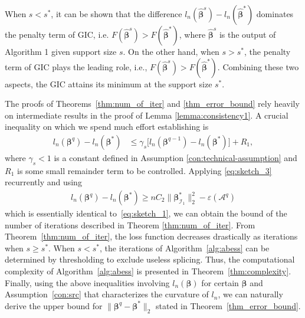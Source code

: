 When $s < s^*$, it can be shown that the difference $l_n(\hat{\boldsymbol \beta}^s) - l_n(\hat{\boldsymbol \beta}^*)$ dominates the penalty term of GIC, i.e. $F(\hat{\boldsymbol \beta}^s) > F(\hat{\boldsymbol \beta}^*)$, where $\hat{\boldsymbol \beta}^s$ is the output of Algorithm 1 given support size $s$. On the other hand, when $s>s^*$, the penalty term of GIC plays the leading role, i.e., $F(\hat{\boldsymbol \beta}^s) > F(\hat{\boldsymbol \beta}^*)$. Combining these two aspects, the GIC attains its minimum at the support size $s^*$.

The proofs of Theorems~\ref{thm:num_of_iter} and \ref{thm_error_bound} rely heavily on intermediate results in the proof of Lemma \ref{lemma:consistency1}. A crucial inequality on which we spend much effort establishing is
\begin{align}\label{eq:sketch_3}
l_n(\boldsymbol \beta^{q})-l_n(\boldsymbol \beta^*) & \leq \gamma_{s}\Big[l_n(\boldsymbol \beta^{q-1})-l_n(\boldsymbol \beta^*)\Big] + R_1,
\end{align}
where $\gamma_s<1$ is a constant defined in Assumption \ref{con:technical-assumption} and $R_1$ is some small remainder term to be controlled. Applying \eqref{eq:sketch_3} recurrently and using
\begin{align}\label{eq:sketch_4}
l_n({\boldsymbol \beta}^{q}) - l_n(\boldsymbol \beta^*) \geq nC_2 \|\boldsymbol \beta^*_{\mathcal{I}_1} \|_2^2 - \varepsilon({\mathcal{A}^{q}})
\end{align}
which is essentially identical to~\eqref{eq:sketch_1}, we can obtain the bound of the number of iterations described in Theorem \ref{thm:num_of_iter}. From Theorem~\ref{thm:num_of_iter}, the loss function decreases drastically as iterations when $s \geq s^*$. When $s<s^*$, the iterations of Algorithm~\ref{alg:abess} can be determined by thresholding to exclude useless splicing. Thus, the computational complexity of Algorithm~\ref{alg:abess} is presented in Theorem~\ref{thm:complexity}.
Finally, using the above inequalities involving $l_n({\boldsymbol \beta})$ for certain $\boldsymbol \beta$ and Assumption~\ref{con:src} that characterizes the curvature of $l_n$, we can naturally derive the upper bound for $\|\boldsymbol \beta^q-\boldsymbol \beta^{*}\|_{2}$ stated in Theorem~\ref{thm_error_bound}.

